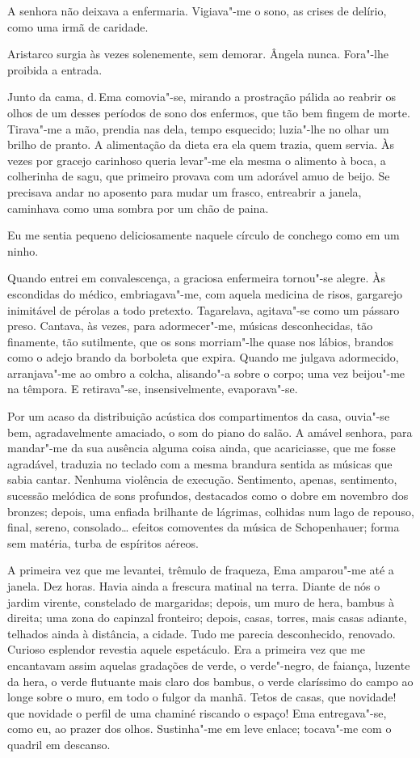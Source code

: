 A senhora não deixava a enfermaria. Vigiava"-me o sono,
as crises de delírio, como uma irmã de caridade. 

Aristarco surgia às
vezes solenemente, sem demorar. Ângela nunca. Fora"-lhe proibida a
entrada. 

Junto da cama, d.\,Ema comovia"-se, mirando a prostração
pálida ao reabrir os olhos de um desses períodos de sono dos enfermos,
que tão bem fingem de morte. Tirava"-me a mão, prendia nas dela, tempo
esquecido; luzia"-lhe no olhar um brilho de pranto. A alimentação da
dieta era ela quem trazia, quem servia. Às vezes por gracejo carinhoso
queria levar"-me ela mesma o alimento à boca, a colherinha de sagu,
que primeiro provava com um adorável amuo de beijo. Se precisava andar
no aposento para mudar um frasco, entreabrir a janela, caminhava como
uma sombra por um chão de paina. 

Eu me sentia pequeno deliciosamente
naquele círculo de conchego como em um ninho. 

Quando entrei em
convalescença, a graciosa enfermeira tornou"-se alegre. Às escondidas
do médico, embriagava"-me, com aquela medicina de risos, gargarejo
inimitável de pérolas a todo pretexto. Tagarelava, agitava"-se como um
pássaro preso. Cantava, às vezes, para adormecer"-me, músicas
desconhecidas, tão finamente, tão sutilmente, que os sons morriam"-lhe
quase nos lábios, brandos como o adejo brando da borboleta que expira.
Quando me julgava adormecido, arranjava"-me ao ombro a colcha,
alisando"-a sobre o corpo; uma vez beijou"-me na têmpora. E
retirava"-se, insensivelmente, evaporava"-se.

Por um acaso da distribuição acústica dos compartimentos da casa,
ouvia"-se bem, agradavelmente amaciado, o som do piano do salão. A
amável senhora, para mandar"-me da sua ausência alguma coisa ainda,
que acariciasse, que me fosse agradável, traduzia no teclado com a
mesma brandura sentida as músicas que sabia cantar. Nenhuma violência
de execução. Sentimento, apenas, sentimento, sucessão melódica de sons
profundos, destacados como o dobre em novembro dos bronzes; depois, uma
enfiada brilhante de lágrimas, colhidas num lago de repouso, final,
sereno, consolado\ldots{} efeitos comoventes da música de Schopenhauer;
forma sem matéria, turba de espíritos aéreos. 

A primeira vez que me
levantei, trêmulo de fraqueza, Ema amparou"-me até a janela. Dez
horas. Havia ainda a frescura matinal na terra. Diante de nós o jardim
virente, constelado de margaridas; depois, um muro de hera, bambus à
direita; uma zona do capinzal fronteiro; depois, casas, torres, mais
casas adiante, telhados ainda à distância, a cidade. Tudo me parecia
desconhecido, renovado. Curioso esplendor revestia aquele espetáculo.
Era a primeira vez que me encantavam assim aquelas gradações de verde,
o verde"-negro, de faiança, luzente da hera, o verde flutuante mais
claro dos bambus, o verde claríssimo do campo ao longe sobre o muro, em
todo o fulgor da manhã. Tetos de casas, que novidade! que novidade o
perfil de uma chaminé riscando o espaço! Ema entregava"-se, como eu,
ao prazer dos olhos. Sustinha"-me em leve enlace; tocava"-me com o
quadril em descanso. 

